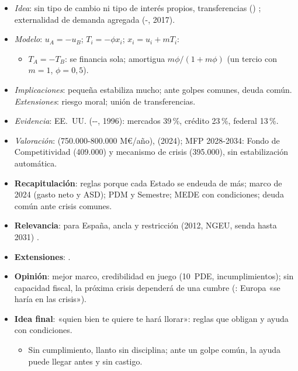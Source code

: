 \documentclass{article}
\begin{document}
\begin{columnas}
\begin{itemize}
\item \emph{Idea}: sin tipo de cambio ni tipo de interés propios, transferencias () ; externalidad de demanda agregada (-, 2017).
\item \emph{Modelo}: $u_A=-u_B$; $T_i=-\phi x_i$; $x_i=u_i+mT_i$:
  \begin{itemize}
  \item $T_A=-T_B$: se financia sola; amortigua $m\phi/(1+m\phi)$ (un tercio con $m=1$, $\phi=0{,}5$).
  \end{itemize}
\item \emph{Implicaciones}: pequeña estabiliza mucho; ante golpes comunes, deuda común. \emph{Extensiones}: riesgo moral; unión de transferencias.
\item \emph{Evidencia}: EE.~UU. (--, 1996): mercados 39\,\%, crédito 23\,\%, federal 13\,\%.
\item \emph{Valoración}:  (750.000-800.000 M€/año),  (2024); MFP 2028-2034: Fondo de Competitividad (409.000) y mecanismo de crisis (395.000), sin estabilización automática.
\end{itemize}

\begin{itemize}
\item \textbf{Recapitulación}: reglas porque cada Estado se endeuda de más; marco de 2024 (gasto neto y ASD); PDM y Semestre; MEDE con condiciones; deuda común ante crisis comunes.
\item \textbf{Relevancia}: para España, ancla y restricción (2012, NGEU, senda hasta 2031) .
\item \textbf{Extensiones}:      .
\item \textbf{Opinión}: mejor marco, credibilidad en juego (10~PDE, incumplimientos); sin capacidad fiscal, la próxima crisis dependerá de una cumbre (: Europa «se haría en las crisis»).
\item \textbf{Idea final}: «quien bien te quiere te hará llorar»: reglas que obligan y ayuda con condiciones.
  \begin{itemize}
  \item Sin cumplimiento, llanto sin disciplina; ante un golpe común, la ayuda puede llegar antes y sin castigo.
  \end{itemize}
\end{itemize}


\end{columnas}
\end{document}
